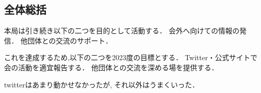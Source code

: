 \subsection*{全体総括}


本局は引き続き以下の二つを目的として活動する．
    会外へ向けての情報の発信．
    他団体との交流のサポート．
 
これを達成するため,以下の二つを2023度の目標とする．
    Twitter・公式サイトで会の活動を適宜報告する．
    他団体との交流を深める場を提供する．

twitterはあまり動かせなかったが, それ以外はうまくいった．

